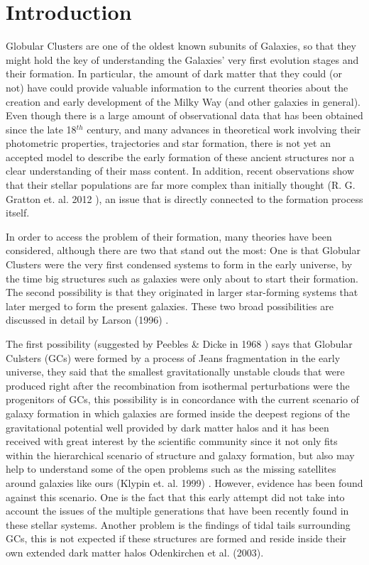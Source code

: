 \chapter{Introduction}

Globular Clusters are one of the oldest known subunits of Galaxies, so that they might hold the key of understanding the Galaxies' very first evolution stages and their formation. In particular, the amount of dark matter that they could (or not) have could provide valuable information to the current theories about the creation and early development of the Milky Way (and other galaxies in general). Even though there is a large amount of observational data that has been obtained since the late 18$^{th}$ century, and many advances in theoretical work involving their photometric properties, trajectories and star formation, there is not yet an accepted model to describe the early formation of these ancient structures nor a clear understanding of their mass content. In addition, recent observations show that their stellar populations are far more complex than initially thought (R. G. Gratton et. al. 2012 \cite{8}), an issue that is directly connected to the formation process itself. 

In order to access the problem of their formation, many theories have been considered, although there are two that stand out the most: One is that Globular Clusters were the very first condensed systems to form in the early universe, by the time big structures such as galaxies were only about to start their formation. The second possibility is that they originated in larger star-forming systems that later merged to form the present galaxies. These two broad possibilities are discussed in detail by Larson (1996) \cite{9}.

The first possibility (suggested by Peebles \& Dicke in 1968 \citep{7}) says that Globular Culsters (GCs) were formed by a process of Jeans fragmentation in the early universe, they said that the smallest gravitationally unstable clouds that were produced right after the recombination from isothermal perturbations were the progenitors of GCs, this possibility is in concordance with the current scenario of galaxy formation in which galaxies are formed inside the deepest regions of the gravitational potential well provided by dark matter halos and it has been received with great interest by the scientific community since it not only fits within the hierarchical scenario of structure and galaxy formation, but also may help to understand some of the open problems such as the missing satellites around galaxies like ours (Klypin et. al. 1999) \cite{11}. However, evidence has been found against this scenario. One is the fact that this early attempt did not take into account the issues of the multiple generations that have been recently found in these stellar systems. Another problem is the findings of tidal tails surrounding GCs, this is not expected if these structures are formed and reside inside their own extended dark matter halos Odenkirchen et al. (2003)\cite{12}.

